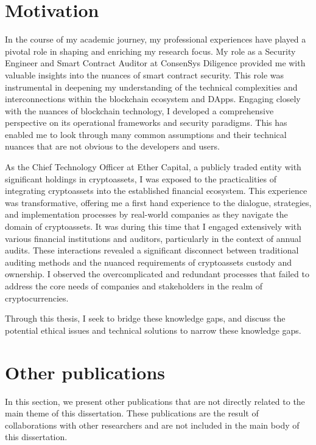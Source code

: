 \section{Motivation} \label{sec:intro:motivation}
In the course of my academic journey, my professional experiences have played a pivotal role in shaping and enriching my research focus. My role as a Security Engineer and Smart Contract Auditor at ConsenSys Diligence provided me with valuable insights into the nuances of smart contract security. This role was instrumental in deepening my understanding of the technical complexities and interconnections within the blockchain ecosystem and DApps. Engaging closely with the nuances of blockchain technology, I developed a comprehensive perspective on its operational frameworks and security paradigms. This has enabled me to look through many common assumptions and their technical nuances that are not obvious to the developers and users.

As the Chief Technology Officer at Ether Capital, a publicly traded entity with significant holdings in cryptoassets, I was exposed to the practicalities of integrating cryptoassets into the established financial ecosystem. This experience was transformative, offering me a first hand experience to the dialogue, strategies, and implementation processes by real-world companies as they navigate the domain of cryptoassets. It was during this time that I engaged extensively with various financial institutions and auditors, particularly in the context of annual audits. These interactions revealed a significant disconnect between traditional auditing methods and the nuanced requirements of cryptoassets custody and ownership. I observed the overcomplicated and redundant processes that failed to address the core needs of companies and stakeholders in the realm of cryptocurrencies.

Through this thesis, I seek to bridge these knowledge gaps, and discuss the potential ethical issues and technical solutions to narrow these knowledge gaps. 


\section{Other publications}
In this section, we present other publications that are not directly related to the main theme of this dissertation. These publications are the result of collaborations with other researchers and are not included in the main body of this dissertation.

